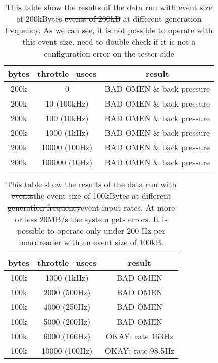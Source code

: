\documentclass[12pt]{article}
\newcommand {\add}[1]    {{\red #1}}
\newcommand {\del}[1]    {{\blue \sout{#1}}}
\newcommand {\red}       {\color{red}}
\newcommand {\blue}      {\color{blue}}
\begin{document}
\begin{center}  
\begin{table}[!h]
\centering
\begin{tabular}{c c c}
\hline
bytes & throttle\_usecs &  result\\
\hline
200k & 0 & BAD OMEN \& back pressure \\
200k & 10 (100kHz) & BAD OMEN \& back pressure \\
200k & 100 (10kHz) & BAD OMEN \& back pressure\\
200k & 1000 (1kHz) & BAD OMEN \& back pressure \\
200k & 10000 (100Hz) & BAD OMEN \& back pressure \\
200k & 100000 (10Hz) & BAD OMEN \& back pressure\\
\end{tabular}
\caption{
  \del{This table show the} results of \add{the} data run with \add{event size of 200kBytes}
  \del{events of 200kB} at different generation frequency.
  As we can see, it is not possible to operate with this event size.
  \add{need to double check if it is not a configuration error on the tester side}
}
\end{table}\label{tab:upperlimits}
\end{center}
\begin{center}  
\begin{table}[!h]
\centering
\begin{tabular}{c c c}
\hline
bytes & throttle\_usecs &  result\\
\hline
100k & 1000 (1kHz) & BAD OMEN \\
100k & 2000 (500Hz) & BAD OMEN \\
100k & 4000 (250Hz) & BAD OMEN \\
100k & 5000 (200Hz) & BAD OMEN \\
100k & 6000 (166Hz) & OKAY: rate 163Hz \\
100k & 10000 (100Hz) & OKAY: rate 98.5Hz \\
\end{tabular}
\caption{\del{This table show the} results of \add{the} data run with \del{events}\add{the event size}
  of 100kBytes at different \del{generation frequency}\add{event input rates}.
  At more or less 20MB/s the system gets errors.
  It is possible to operate only under 200 Hz per boardreader with an event size of 100kB.}
\end{table}\label{tab:upperlimits}
\end{center}
\end{document}
